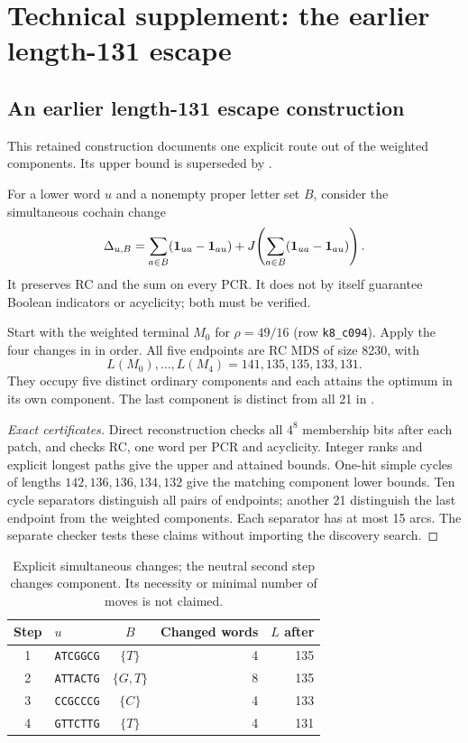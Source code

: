 \section{Technical supplement: the earlier length-131 escape}

\subsection{An earlier length-131 escape construction}
\label{sec:construction-131}
This retained construction documents one explicit route out of the weighted
components. Its upper bound is superseded by .

For a lower word $u$ and a nonempty proper letter set $B$, consider
the simultaneous cochain change
\[
 \Delta_{u,B}=\sum_{a\in B}(\mathbf 1_{ua}-\mathbf 1_{au})
       +J\!\left(\sum_{a\in B}(\mathbf 1_{ua}-\mathbf 1_{au})\right).
\]
It preserves RC and the sum on every PCR. It does not by itself
guarantee Boolean indicators or acyclicity; both must be verified.

\begin{proposition}\label{prop:construction-131}
Start with the weighted terminal $M_0$ for $\rho=49/16$
(row \texttt{k8\_c094}). Apply the four changes in
 in order. All five endpoints are RC MDS
of size 8230, with
\[
 \boxed{L(M_0),\ldots,L(M_4)=141,135,135,133,131.}
\]
They occupy five distinct ordinary components and each attains
the optimum in its own component. The last component is distinct
from all 21 in .
\end{proposition}
\begin{proof}[Exact certificates]
Direct reconstruction checks all $4^8$ membership bits after each
patch, and checks RC, one word per PCR and acyclicity. Integer
ranks and explicit longest paths give the upper and attained
bounds. One-hit simple cycles of lengths $142,136,136,134,132$
give the matching component lower bounds. Ten cycle separators
distinguish all pairs of endpoints; another 21 distinguish the
last endpoint from the weighted components. Each separator has
at most 15 arcs. The separate checker tests these claims without
importing the discovery search.
\end{proof}

\begin{table}[ht]
\centering
\begin{tabular}{clcrr}
\toprule
Step & $u$ & $B$ & Changed words & $L$ after\\
\midrule
1&\texttt{ATCGGCG}&$\{T\}$&4&135\\
2&\texttt{ATTACTG}&$\{G,T\}$&8&135\\
3&\texttt{CCGCCCG}&$\{C\}$&4&133\\
4&\texttt{GTTCTTG}&$\{T\}$&4&131\\
\bottomrule
\end{tabular}
\caption{Explicit simultaneous changes; the neutral second step
changes component. Its necessity or minimal number of moves is not claimed.}
\label{tab:patches}
\end{table}

